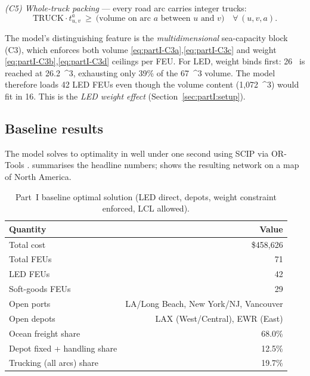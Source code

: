 \documentclass[11pt,a4paper]{article}
\numberwithin{equation}{section}
\newcommand{\USD}[1]{\$#1}
\newcommand{\mcube}{\text{m}^{3}}
\newcommand{\tonne}{\text{t}}
\begin{document}
\textit{(C5) Whole-truck packing} — every road arc carries integer trucks:
\begin{equation}
\mathrm{TRUCK} \cdot t^{a}_{u,v} \ \ge \ \text{(volume on arc $a$ between $u$ and $v$)} \quad \forall\,(u,v,a). \label{eq:partI-C5}
\end{equation}

\begin{keybox}
The model's distinguishing feature is the \emph{multidimensional} sea-capacity block (C3), which enforces both volume \eqref{eq:partI-C3a},\eqref{eq:partI-C3c} and weight \eqref{eq:partI-C3b},\eqref{eq:partI-C3d} ceilings per FEU. For LED, weight binds first: 26~\tonne{} is reached at 26.2~\mcube{}, exhausting only 39\% of the 67~\mcube{} volume. The model therefore loads 42 LED FEUs even though the volume content (1{,}072~\mcube) would fit in 16. This is the \emph{LED weight effect} (Section~\ref{sec:partI:setup}).
\end{keybox}

\subsection{Baseline results}\label{sec:partI:baseline}

The model solves to optimality in well under one second using SCIP \cite{scip} via OR-Tools \cite{ortools}.  summarises the headline numbers;  shows the resulting network on a map of North America.

\begin{table}[h]
\centering
\small
\caption{Part~I baseline optimal solution (LED direct, depots, weight constraint enforced, LCL allowed).}
\label{tab:partI-baseline}
\begin{tabular}{@{}lr@{}}
\toprule
\textbf{Quantity} & \textbf{Value} \\
\midrule
Total cost & \USD{458{,}626} \\
Total FEUs & 71 \\
\quad LED FEUs & 42 \\
\quad Soft-goods FEUs & 29 \\
Open ports & LA/Long Beach, New York/NJ, Vancouver \\
Open depots & LAX (West/Central), EWR (East) \\
Ocean freight share & 68.0\% \\
Depot fixed + handling share & 12.5\% \\
Trucking (all arcs) share & 19.7\% \\
\bottomrule
\end{tabular}
\end{table}
\end{document}
